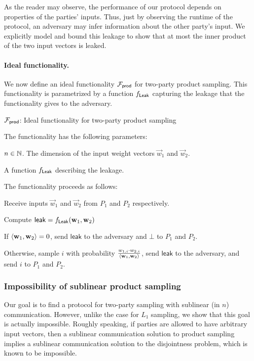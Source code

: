 As the reader may observe, the performance of our protocol depends on
properties of the parties' inputs.  Thus, just by observing the runtime
of the protocol, an adversary may infer information about the other
party's input.  We explicitly model and bound this leakage to show that
at most the inner product of the two input vectors is leaked.
\fi


\paragraph{Ideal functionality.}
We now define an ideal functionality $\mathcal{F}_{\mathsf{prod}}$ for two-party product
sampling. This functionality is parametrized by a function $f_{\mathsf{Leak}}$
capturing the leakage that the functionality gives to the adversary.  

\bbox
{
\begin{center}
 $\mathcal{F}_{\mathsf{prod}}$:  Ideal functionality for two-party product sampling
\end{center}

The functionality has the following parameters:
\BI
\item $n \in \mathbb{N}$. The dimension of the input weight vectors $\vec{w}_1$ and $\vec{w}_2$.
\item A function $f_{\mathsf{Leak}}$ describing the leakage.

\EI

The functionality proceeds as follows:
\BEN
\item Receive inputs $\vec w_1$ and $\vec w_2$ from $P_1$ and $P_2$
respectively. 
\item Compute $\mathsf{leak}=f_{\mathsf{Leak}}(\mathbf{w}_1,\mathbf{w}_2)$
\item If $\langle \mathbf{w}_1, \mathbf{w}_2 \rangle=0$, send $\mathsf{leak}$ to the adversary and $\bot$ to
$P_1$ and $P_2$. 
\item Otherwise, sample $i$ with probability $\frac{w_{1,i} \cdot
w_{2,i}}{\langle \mathbf{w}_1, \mathbf{w}_2 \rangle}$, send $\mathsf{leak}$ to the
adversary, and send $i$ to $P_1$ and $P_2$.
\EEN 
}

\medskip


\subsubsection{Impossibility of sublinear product sampling}\label{sec:prodLB}
Our goal is to find a protocol for two-party sampling with sublinear (in
$n$) communication.  However, unlike the case for $L_1$ sampling, we
show that this goal is actually impossible. Roughly speaking, if parties
are allowed to have arbitrary input vectors, then a sublinear
communication solution to product sampling implies a sublinear
communication solution to the disjointness problem, which is known to be
impossible.

